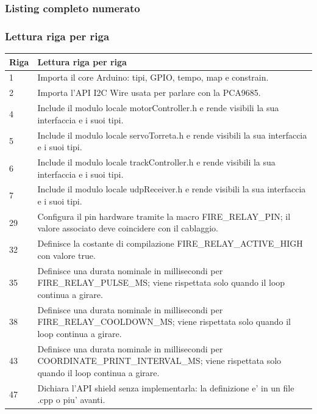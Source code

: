 \documentclass[11pt,a4paper]{article}
\begin{document}
\subsubsection{Listing completo numerato}


\subsubsection{Lettura riga per riga}
\begin{longtable}{p{}p{}}
\toprule
\textbf{Riga} & \textbf{Lettura riga per riga} \\
\midrule
\endhead
1 & Importa il core Arduino: tipi, GPIO, tempo, map e constrain. \\
2 & Importa l'API I2C Wire usata per parlare con la PCA9685. \\
4 & Include il modulo locale motorController.h e rende visibili la sua interfaccia e i suoi tipi. \\
5 & Include il modulo locale servoTorreta.h e rende visibili la sua interfaccia e i suoi tipi. \\
6 & Include il modulo locale trackController.h e rende visibili la sua interfaccia e i suoi tipi. \\
7 & Include il modulo locale udpReceiver.h e rende visibili la sua interfaccia e i suoi tipi. \\
29 & Configura il pin hardware tramite la macro FIRE\_\allowbreak{}RELAY\_\allowbreak{}PIN; il valore associato deve coincidere con il cablaggio. \\
32 & Definisce la costante di compilazione FIRE\_\allowbreak{}RELAY\_\allowbreak{}ACTIVE\_\allowbreak{}HIGH con valore true. \\
35 & Definisce una durata nominale in millisecondi per FIRE\_\allowbreak{}RELAY\_\allowbreak{}PULSE\_\allowbreak{}MS; viene rispettata solo quando il loop continua a girare. \\
38 & Definisce una durata nominale in millisecondi per FIRE\_\allowbreak{}RELAY\_\allowbreak{}COOLDOWN\_\allowbreak{}MS; viene rispettata solo quando il loop continua a girare. \\
43 & Definisce una durata nominale in millisecondi per COORDINATE\_\allowbreak{}PRINT\_\allowbreak{}INTERVAL\_\allowbreak{}MS; viene rispettata solo quando il loop continua a girare. \\
47 & Dichiara l'API shield senza implementarla: la definizione e' in un file .cpp o piu' avanti. \\

\end{longtable}
\end{document}
